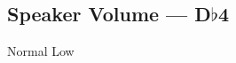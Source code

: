 \subsection[Speaker Volume]{Speaker Volume --- \UiKey{\SET}D$\flat$4}









































Normal
Low
